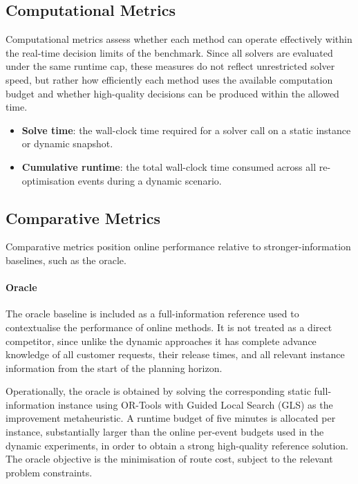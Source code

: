 \subsection{Computational Metrics}

Computational metrics assess whether each method can operate effectively within
the real-time decision limits of the benchmark. Since all solvers are evaluated
under the same runtime cap, these measures do not reflect unrestricted solver
speed, but rather how efficiently each method uses the available computation
budget and whether high-quality decisions can be produced within the allowed
time.

\begin{itemize}
    \item \textbf{Solve time}: the wall-clock time required for a solver call on a static instance or dynamic snapshot.

    \item \textbf{Cumulative runtime}: the total wall-clock time consumed across all re-optimisation events during a dynamic scenario.
\end{itemize}

\subsection{Comparative Metrics}

Comparative metrics position online performance relative to stronger-information
baselines, such as the oracle.
\paragraph{Oracle}

The oracle baseline is included as a full-information reference used to
contextualise the performance of online methods. It is not treated as a direct
competitor, since unlike the dynamic approaches it has complete advance
knowledge of all customer requests, their release times, and all relevant
instance information from the start of the planning horizon.

Operationally, the oracle is obtained by solving the corresponding static
full-information instance using OR-Tools with Guided Local Search (GLS) as the
improvement metaheuristic. A runtime budget of five minutes is allocated per
instance, substantially larger than the online per-event budgets used in the
dynamic experiments, in order to obtain a strong high-quality reference
solution. The oracle objective is the minimisation of route cost, subject to the
relevant problem constraints.

